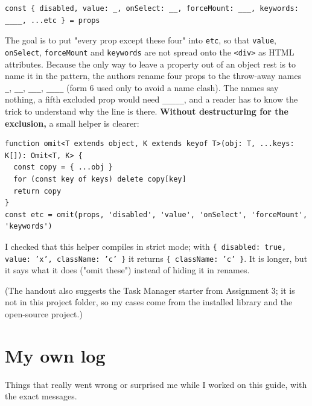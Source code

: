 \documentclass[
  10pt,
]{article}
\begin{document}
\begin{verbatim}
const { disabled, value: _, onSelect: __, forceMount: ___, keywords: ____, ...etc } = props
\end{verbatim}

The goal is to put "every prop except these four" into \texttt{etc}, so
that \texttt{value}, \texttt{onSelect}, \texttt{forceMount} and
\texttt{keywords} are not spread onto the \texttt{<div>} as HTML
attributes. Because the only way to leave a property out of an object
rest is to name it in the pattern, the authors rename four props to the
throw-away names \texttt{\_}, \texttt{\_\_}, \texttt{\_\_\_},
\texttt{\_\_\_\_} (form 6 used only to avoid a name clash). The names
say nothing, a fifth excluded prop would need \texttt{\_\_\_\_\_}, and a
reader has to know the trick to understand why the line is there.
\textbf{Without destructuring for the exclusion,} a small helper is
clearer:

\begin{verbatim}
function omit<T extends object, K extends keyof T>(obj: T, ...keys: K[]): Omit<T, K> {
  const copy = { ...obj }
  for (const key of keys) delete copy[key]
  return copy
}
const etc = omit(props, 'disabled', 'value', 'onSelect', 'forceMount', 'keywords')
\end{verbatim}

I checked that this helper compiles in strict mode; with
\texttt{\{ disabled:\allowbreak{} true,\allowbreak{} value:\allowbreak{} 'x',\allowbreak{} className:\allowbreak{} 'c' \}}
it returns \texttt{\{ className:\allowbreak{} 'c' \}}. It is longer, but
it says what it does ("omit these") instead of hiding it in renames.

(The handout also suggests the Task Manager starter from Assignment 3;
it is not in this project folder, so my cases come from the installed
library and the open-source project.)

\hypertarget{my-own-log}{%
\section{My own log}\label{my-own-log}}

Things that really went wrong or surprised me while I worked on this
guide, with the exact messages.
\end{document}
